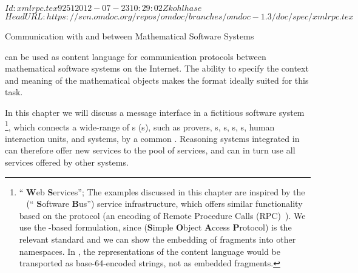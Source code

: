 \svnInfo $Id: xmlrpc.tex 9251 2012-07-23 10:29:02Z kohlhase $
\svnKeyword $HeadURL: https://svn.omdoc.org/repos/omdoc/branches/omdoc-1.3/doc/spec/xmlrpc.tex $

\begin{tchapter}[id=rpc,short=Communication between Systems]{Communication with and between Mathematical Software Systems}

{\omdoc} can be used as content language for communication protocols between
mathematical software systems on the Internet. The ability to specify the context
and meaning of the mathematical objects makes the {\omdoc} format ideally suited
for this task.

In this chapter we will discuss a message interface in a fictitious software system
{\mathwebws}\footnote{``{\mathweb} {\bf{W}}eb {\bf{S}}ervices''; The examples discussed in
  this chapter are inspired by the {\mathwebsb}~\cite{FraKoh:mabdl99,ZimKoh:tmsbdmr02}
  (``{\mathweb} {\bf{S}}oftware {\bf{B}}us'') service infrastructure, which offers similar
  functionality based on the {\xmlrpc} protocol (an {\xml} encoding of Remote Procedure
  Calls (RPC)~\cite{xmlrpc}). We use the {\soap}-based formulation, since {\soap}
  ({\bf{S}}imple {\bf{O}}bject {\bf{A}}ccess {\bf{P}}rotocol) is the relevant
  {} standard and we can show the embedding of {\omdoc} fragments into other
  {\xml} namespaces. In {\xmlrpc}, the {\xml} representations of the content language
  {\omdoc} would be transported as base-64-encoded strings, not as embedded {\xml}
  fragments. }, which connects a wide-range of {s}
({s}), such as { {prover}s},
{s}, {s},
{s}, {s}, human interaction units,
and { {system}s}, by a common
{}.  Reasoning systems integrated in {\mathwebws} can
therefore offer new services to the pool of services, and can in turn use all services
offered by other systems.


\end{tchapter}
